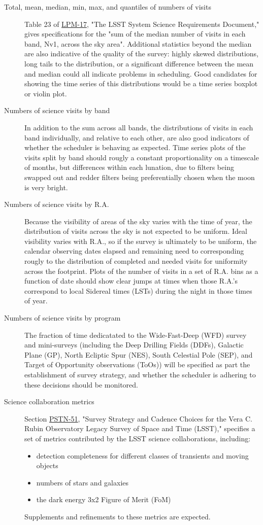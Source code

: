 \begin{description}
\item[{Total, mean, median, min, max, and quantiles of numbers of visits}] Table 23 of \href{http://ls.st/lpm-17}{LPM-17}, "The LSST System Science Requirements Document," gives specifications for the "sum of the median number of visits in each band, Nv1, across the sky area". Additional statistics beyond the median are also indicative of the quality of the survey: highly skewed distributions, long tails to the distribution, or a significant difference between the mean and median could all indicate problems in scheduling. Good candidates for showing the time series of this distributions would be a time series boxplot or violin plot.
\item[{Numbers of science visits by band}] In addition to the sum across all bands, the distributions of visits in each band individually, and relative to each other, are also good indicators of whether the scheduler is behaving as expected. Time series plots of the visits split by band should rougly a constant proportionality on a timescale of months, but differences within each lunation, due to filters being swapped out and redder filters being preferentially chosen when the moon is very bright.
\item[{Numbers of science visits by R.A.}] Because the visibility of areas of the sky varies with the time of year, the distribution of visits across the sky is not expected to be uniform. Ideal visibility varies with R.A., so if the survey is ultimately to be uniform, the calendar observing dates elapsed and remaining need to corresponding rougly to the distribution of completed and needed visits for uniformity across the footprint. Plots of the number of visits in a set of R.A. bins as a function of date should show clear jumps at times when those R.A.'s correspond to local Sidereal times (LSTs) during the night in those times of year.
\item[{Numbers of science visits by program}] The fraction of time dedicatated to the Wide-Fast-Deep (WFD) survey and mini-surveys (including the Deep Drilling Fields (DDFs), Galactic Plane (GP), North Ecliptic Spur (NES), South Celestial Pole (SEP), and Target of Opportunity observations (ToOs)) will be specified as part the establishment of survey strategy, and whether the scheduler is adhering to these decisions should be monitored.
\item[{Science collaboration metrics}] Section \href{https://ls.st/pstn-051}{PSTN-51}, "Survey Strategy and Cadence Choices for the Vera C. Rubin Observatory Legacy Survey of Space and Time (LSST)," specifies a set of metrics contributed by the LSST science collaborations, including:
\begin{itemize}
\item detection completeness for different classes of transients and moving objects
\item numbers of stars and galaxies
\item the dark energy 3x2 Figure of Merit (FoM)
\end{itemize}
Supplements and refinements to these metrics are expected.
\end{description}

